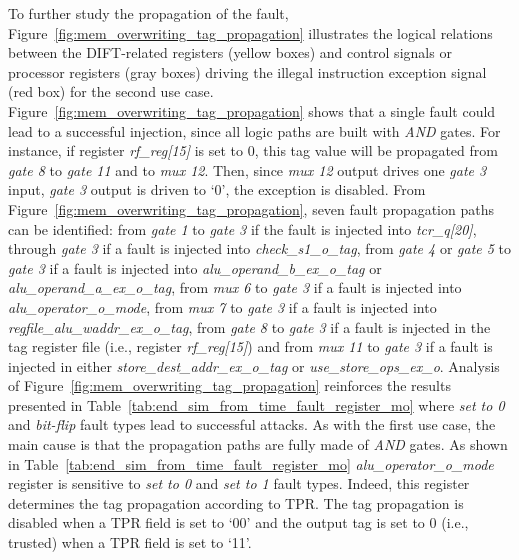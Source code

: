 To further study the propagation of the fault, Figure~\ref{fig:mem_overwriting_tag_propagation} illustrates the logical relations between the DIFT-related registers (yellow boxes) and control signals or processor registers (gray boxes) driving the illegal instruction exception signal (red box) for the second use case. 
Figure~\ref{fig:mem_overwriting_tag_propagation} shows that a single fault could lead to a successful injection, since all logic paths are built with \textit{AND} gates. For instance, if register \textit{rf\_reg[15]} is set to 0, this tag value will be propagated from \textit{gate 8} to \textit{gate 11} and to \textit{mux 12}. Then, since \textit{mux 12} output drives one \textit{gate 3} input, \textit{gate 3} output is driven to `0', the exception is disabled. 
From Figure~\ref{fig:mem_overwriting_tag_propagation}, seven fault propagation paths can be identified: 
from \textit{gate 1} to \textit{gate 3} if the fault is injected into \textit{tcr\_q[20]},
through \textit{gate 3} if a fault is injected into \textit{check\_s1\_o\_tag},
from \textit{gate 4} or \textit{gate 5} to \textit{gate 3} if a fault is injected into \textit{alu\_operand\_b\_ex\_o\_tag} or \textit{alu\_operand\_a\_ex\_o\_tag},
from \textit{mux 6} to \textit{gate 3} if a fault is injected into \textit{alu\_operator\_o\_mode},
from \textit{mux 7} to \textit{gate 3} if a fault is injected into \textit{regfile\_alu\_waddr\_ex\_o\_tag},
from \textit{gate 8} to \textit{gate 3} if a fault is injected in the tag register file (i.e., register \textit{rf\_reg[15]}) and
from \textit{mux 11} to \textit{gate 3} if a fault is injected in either \textit{store\_dest\_addr\_ex\_o\_tag} or \textit{use\_store\_ops\_ex\_o}.
Analysis of Figure~\ref{fig:mem_overwriting_tag_propagation} reinforces the results presented in Table~\ref{tab:end_sim_from_time_fault_register_mo} where \textit{set to 0} and \textit{bit-flip} fault types lead to successful attacks. As with the first use case, the main cause is that the propagation paths are fully made of \textit{AND} gates. As shown in Table~\ref{tab:end_sim_from_time_fault_register_mo} \textit{alu\_operator\_o\_mode} register is sensitive to \textit{set to 0} and \textit{set to 1} fault types. Indeed, this register determines the tag propagation according to TPR. The tag propagation is disabled when a TPR field is set to `00' and the output tag is set to 0 (i.e., trusted) when a TPR field is set to `11'.

